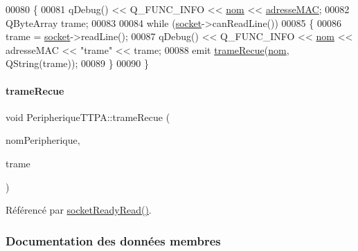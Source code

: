 \begin{DoxyCode}
00080 \{
00081     qDebug() << Q\_FUNC\_INFO << \hyperlink{class_peripherique_t_t_p_a_afafe3566b4b5357819811218b9a4244f}{nom} << \hyperlink{class_peripherique_t_t_p_a_a444063230c83cf81eff8a3a55736f2cf}{adresseMAC};
00082     QByteArray trame;
00083 
00084     \textcolor{keywordflow}{while} (\hyperlink{class_peripherique_t_t_p_a_ab66f30984a7f9fa17fd28391efe968a9}{socket}->canReadLine())
00085     \{
00086         trame = \hyperlink{class_peripherique_t_t_p_a_ab66f30984a7f9fa17fd28391efe968a9}{socket}->readLine();
00087         qDebug() << Q\_FUNC\_INFO << \hyperlink{class_peripherique_t_t_p_a_afafe3566b4b5357819811218b9a4244f}{nom} << adresseMAC << \textcolor{stringliteral}{"trame"} << trame;
00088         emit \hyperlink{class_peripherique_t_t_p_a_aaa8699b83c9659c874a0d066ea633e45}{trameRecue}(\hyperlink{class_peripherique_t_t_p_a_afafe3566b4b5357819811218b9a4244f}{nom}, QString(trame));
00089     \}
00090 \}
\end{DoxyCode}
\mbox{\label{class_peripherique_t_t_p_a_aaa8699b83c9659c874a0d066ea633e45}} 
\paragraph{\texorpdfstring{trame\+Recue}{trameRecue}}
{\footnotesize\ttfamily void Peripherique\+T\+T\+P\+A\+::trame\+Recue (\begin{DoxyParamCaption}\item[{Q\+String}]{nom\+Peripherique,  }\item[{Q\+String}]{trame }\end{DoxyParamCaption})\hspace{0.3cm}{\ttfamily [signal]}}



Référencé par \hyperlink{class_peripherique_t_t_p_a_a4e1d676e59b293161a40ee6428a79871}{socket\+Ready\+Read()}.



\subsubsection{Documentation des données membres}
\mbox{\label{class_peripherique_t_t_p_a_ab66f30984a7f9fa17fd28391efe968a9}} 

